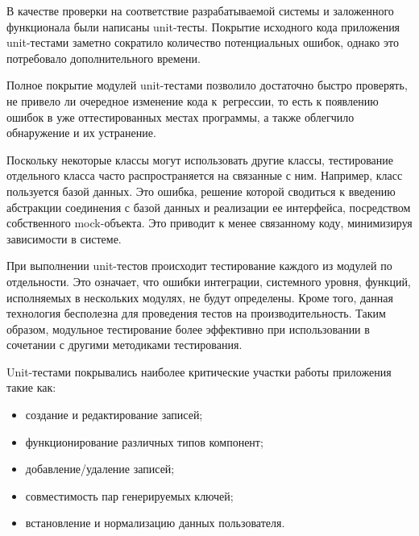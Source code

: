 В качестве проверки на соответствие разрабатываемой системы и заложенного функционала были написаны unit-тесты. Покрытие исходного кода приложения unit-тестами заметно сократило количество потенциальных ошибок, однако это потребовало дополнительного времени.

Полное покрытие модулей unit-тестами позволило достаточно быстро проверять, не привело ли очередное изменение кода к регрессии, то есть к появлению ошибок в уже оттестированных местах программы, а также облегчило обнаружение и их устранение.

Поскольку некоторые классы могут использовать другие классы, тестирование отдельного класса часто распространяется на связанные с ним. Например, класс пользуется базой данных. Это ошибка, решение которой сводиться к введению абстракции соединения с базой данных и реализации ее интерфейса, посредством собственного mock-объекта. Это приводит к менее связанному коду, минимизируя зависимости в системе.

При выполнении unit-тестов происходит тестирование каждого из модулей по отдельности. Это означает, что ошибки интеграции, системного уровня, функций, исполняемых в нескольких модулях, не будут определены. Кроме того, данная технология бесполезна для проведения тестов на производительность. Таким образом, модульное тестирование более эффективно при использовании в сочетании с другими методиками тестирования.

Unit-тестами покрывались наиболее критические участки работы приложения такие как:
\begin{itemize}
  \item создание и редактирование записей;
  \item функционирование различных типов компонент;
  \item добавление/удаление записей;
  \item совместимость пар генерируемых ключей;
  \item встановление и нормализацию данных пользователя.
\end{itemize}